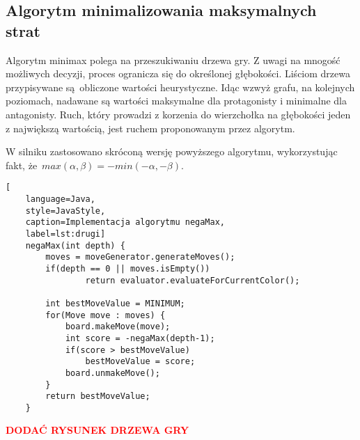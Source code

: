 \subsection{Algorytm minimalizowania maksymalnych strat}
\label{subsec:algorytm-minimalizowania-maksymalnych-strat}

Algorytm minimax polega na przeszukiwaniu drzewa gry.
Z uwagi na mnogość możliwych decyzji, proces ogranicza się do określonej głębokości.
Liściom drzewa przypisywane są~obliczone wartości heurystyczne.
Idąc wzwyż grafu, na kolejnych poziomach, nadawane są wartości maksymalne dla protagonisty i minimalne dla antagonisty.
Ruch, który prowadzi z korzenia do wierzchołka na głębokości jeden z największą wartością, jest ruchem proponowanym przez algorytm.

W silniku zastosowano skróconą wersję powyższego algorytmu, wykorzystując fakt, że~$max(\alpha, \beta) = -min(-\alpha, -\beta)$.

\begin{lstlisting}[
    language=Java,
    style=JavaStyle,
    caption=Implementacja algorytmu negaMax,
    label=lst:drugi]
    negaMax(int depth) {
        moves = moveGenerator.generateMoves();
        if(depth == 0 || moves.isEmpty())
                return evaluator.evaluateForCurrentColor();

        int bestMoveValue = MINIMUM;
        for(Move move : moves) {
            board.makeMove(move);
            int score = -negaMax(depth-1);
            if(score > bestMoveValue)
                bestMoveValue = score;
            board.unmakeMove();
        }
        return bestMoveValue;
    }
\end{lstlisting}

\begin{center}
    \textcolor{red}{\textbf{DODAĆ RYSUNEK DRZEWA GRY}}
\end{center}

